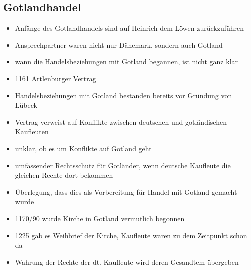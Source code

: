 \documentclass[10pt,a4paper,oneside,ngerman,numbers=noenddot]{scrartcl}
\newenvironment{myitemize}{\begin{itemize}\itemsep -8pt}{\end{itemize}} %
\begin{document}
\subsection*{Gotlandhandel}
\begin{myitemize}
    \item Anfänge des Gotlandhandels sind auf Heinrich dem Löwen zurückzuführen
    \item Ansprechpartner waren nicht nur Dänemark, sondern auch Gotland
    \item wann die Handelsbeziehungen mit Gotland begannen, ist nicht ganz klar
    \item 1161 Artlenburger Vertrag
    \item Handelsbeziehungen mit Gotland bestanden bereits vor Gründung von Lübeck
    \item Vertrag verweist auf Konflikte zwischen deutschen und gotländischen Kaufleuten
    \item unklar, ob es um Konflikte auf Gotland geht
    \item umfassender Rechtsschutz für Gotländer, wenn deutsche Kaufleute die gleichen Rechte dort bekommen
    \item Überlegung, dass dies als Vorbereitung für Handel mit Gotland gemacht wurde
    \item 1170/90 wurde Kirche in Gotland vermutlich begonnen
    \item 1225 gab es Weihbrief der Kirche, Kaufleute waren zu dem Zeitpunkt schon da
    \item Wahrung der Rechte der dt. Kaufleute wird deren Gesandtem übergeben
\end{myitemize}
\end{document}
